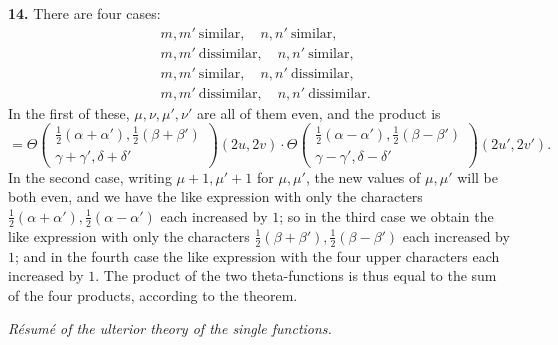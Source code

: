 \documentclass[11pt]{article}
\begin{document}
\medskip

\textbf{14.} There are four cases:
\begin{align*}
&m,m'\ \text{similar},\quad n,n'\ \text{similar},\\
&m,m'\ \text{dissimilar},\quad n,n'\ \text{similar},\\
&m,m'\ \text{similar},\quad n,n'\ \text{dissimilar},\\
&m,m'\ \text{dissimilar},\quad n,n'\ \text{dissimilar}.
\end{align*}
In the first of these, $\mu,\nu,\mu',\nu'$ are all of them even, and the product is
\[
= \Theta\!\begin{pmatrix} \tfrac{1}{2}(\alpha + \alpha'),\tfrac{1}{2}(\beta + \beta') \\ \gamma + \gamma',\delta + \delta' \end{pmatrix}\!(2u, 2v)\cdot \Theta\!\begin{pmatrix} \tfrac{1}{2}(\alpha - \alpha'),\tfrac{1}{2}(\beta - \beta') \\ \gamma - \gamma',\delta - \delta' \end{pmatrix}\!(2u', 2v').
\]
In the second case, writing $\mu + 1,\mu' + 1$ for $\mu,\mu'$, the new values of $\mu,\mu'$ will be both even, and we have the like expression with only the characters $\tfrac{1}{2}(\alpha + \alpha'),\tfrac{1}{2}(\alpha - \alpha')$ each increased by $1$; so in the third case we obtain the like expression with only the characters $\tfrac{1}{2}(\beta + \beta'),\tfrac{1}{2}(\beta - \beta')$ each increased by $1$; and in the fourth case the like expression with the four upper characters each increased by $1$. The product of the two theta-functions is thus equal to the sum of the four products, according to the theorem.

\medskip

\textit{R\'esum\'e of the ulterior theory of the single functions.}

\medskip
\end{document}
